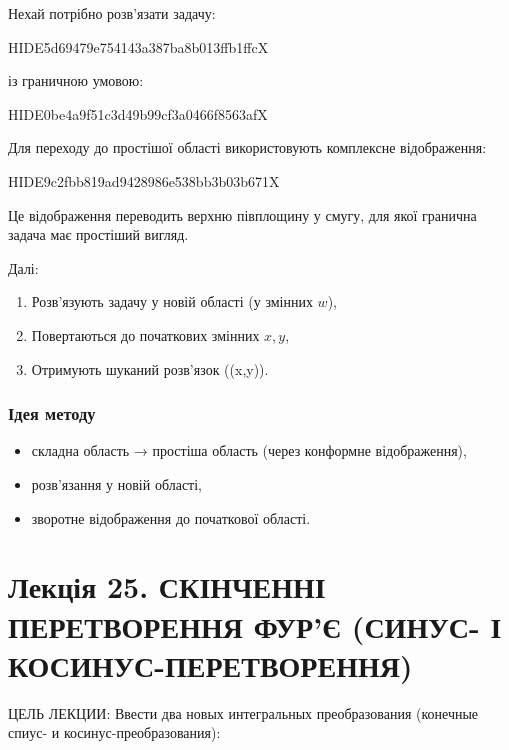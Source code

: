 \documentclass[
  ukrainian,
]{article}
\providecommand{\tightlist}{%
  \setlength{\itemsep}{0pt}\setlength{\parskip}{0pt}}
\begin{document}
Нехай потрібно розв'язати задачу:

HIDE5d69479e754143a387ba8b013ffb1ffcX

із граничною умовою:

HIDE0be4a9f51c3d49b99cf3a0466f8563afX

Для переходу до простішої області використовують комплексне
відображення:

HIDE9c2fbb819ad9428986e538bb3b03b671X

Це відображення переводить верхню півплощину у смугу, для якої гранична
задача має простіший вигляд.

Далі:

\begin{enumerate}
\def\labelenumi{\arabic{enumi}.}
\tightlist
\item
  Розв'язують задачу у новій області (у змінних \(w\)),
\item
  Повертаються до початкових змінних \(x, y\),
\item
  Отримують шуканий розв'язок (\varphi(x,y)).
\end{enumerate}

\subsubsection{Ідея
методу}\label{ux456ux434ux435ux44f-ux43cux435ux442ux43eux434ux443}

\begin{itemize}
\tightlist
\item
  складна область → простіша область (через конформне відображення),
\item
  розв'язання у новій області,
\item
  зворотне відображення до початкової області.
\end{itemize}

\section{Лекція 25. СКІНЧЕННІ ПЕРЕТВОРЕННЯ ФУР'Є (СИНУС- І
КОСИНУС-ПЕРЕТВОРЕННЯ)}\label{ux43bux435ux43aux446ux456ux44f-25.-ux441ux43aux456ux43dux447ux435ux43dux43dux456-ux43fux435ux440ux435ux442ux432ux43eux440ux435ux43dux43dux44f-ux444ux443ux440ux454-ux441ux438ux43dux443ux441--ux456-ux43aux43eux441ux438ux43dux443ux441-ux43fux435ux440ux435ux442ux432ux43eux440ux435ux43dux43dux44f}

ЦЕЛЬ ЛЕКЦИИ: Ввести два новых интегральных преобразования (конечные
спиус- и косинус-преобразования):
\end{document}
